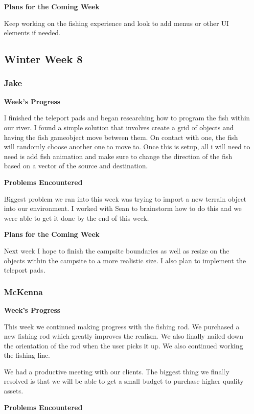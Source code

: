 \documentclass[10pt,journal,compsoc,onecolumn, draftclsnofoot]{IEEEtran}
\begin{document}
\noindent \textbf{Plans for the Coming Week}

Keep working on the fishing experience and look to add menus or other UI elements if needed.

\subsection{Winter Week 8}
\subsubsection{Jake}
\noindent \textbf{Week's Progress}

I finished the teleport pads and began researching how to program the fish within our river. I found a simple solution that involves create a grid of objects and having the fish gameobject move between them. On contact with one, the fish will randomly choose another one to move to. Once this is setup, all i will need to need is add fish animation and make sure to change the direction of the fish based on a vector of the source and destination.

\noindent \textbf{Problems Encountered}

Biggest problem we ran into this week was trying to import a new terrain object into our environment. I worked with Sean to brainstorm how to do this and we were able to get it done by the end of this week.

\noindent \textbf{Plans for the Coming Week}

Next week I hope to finish the campsite boundaries as well as resize on the objects within the campsite to a more realistic size. I also plan to implement the teleport pads.

\subsubsection{McKenna}
\noindent \textbf{Week's Progress}

This week we continued making progress with the fishing rod. We purchased a new fishing rod which greatly improves the realism. We also finally nailed down the orientation of the rod when the user picks it up. We also continued working the fishing line.

We had a productive meeting with our clients. The biggest thing we finally resolved is that we will be able to get a small budget to purchase higher quality assets.

\noindent \textbf{Problems Encountered}
\end{document}
